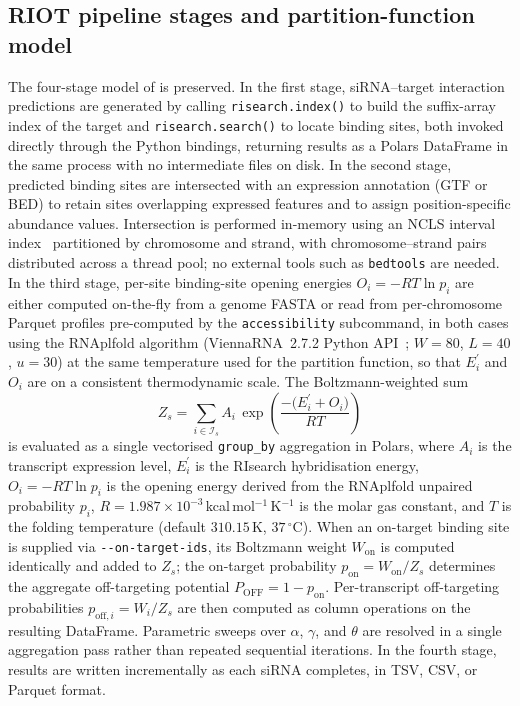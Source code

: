 \subsection*{RIOT pipeline stages and partition-function model}

The four-stage model of \citet{alkan2017risearch2} is preserved.
In the first stage, siRNA--target interaction predictions are generated by calling \texttt{risearch.index()} to build the suffix-array index of the target and \texttt{risearch.search()} to locate binding sites, both invoked directly through the Python bindings, returning results as a Polars DataFrame in the same process with no intermediate files on disk.
In the second stage, predicted binding sites are intersected with an expression annotation (GTF or BED) to retain sites overlapping expressed features and to assign position-specific abundance values.
Intersection is performed in-memory using an NCLS interval index~\citep{ncls} partitioned by chromosome and strand, with chromosome--strand pairs distributed across a thread pool; no external tools such as \texttt{bedtools} are needed.
In the third stage, per-site binding-site opening energies $O_i = -RT\ln p_i$ are either computed on-the-fly from a genome FASTA or read from per-chromosome Parquet profiles pre-computed by the \texttt{accessibility} subcommand, in both cases using the RNAplfold algorithm (ViennaRNA~2.7.2 Python API~\citep{lorenz2011vienna}; $W{=}80$, $L{=}40$, $u{=}30$) at the same temperature used for the partition function, so that $E^\prime_i$ and $O_i$ are on a consistent thermodynamic scale.
The Boltzmann-weighted sum
%
\begin{equation}
  Z_s = \sum_{i \in \mathcal{I}_s}
        A_i \,
        \exp\!\left(\frac{-\bigl(E^\prime_i + O_i\bigr)}{RT}\right)
  \label{eq:partition}
\end{equation}
%
\noindent is evaluated as a single vectorised \texttt{group\_by} aggregation in Polars, where $A_i$ is the transcript expression level, $E^\prime_i$ is the RIsearch hybridisation energy, $O_i = -RT\ln p_i$ is the opening energy derived from the RNAplfold unpaired probability $p_i$, $R = 1.987\times10^{-3}$\,kcal\,mol$^{-1}$\,K$^{-1}$ is the molar gas constant, and $T$ is the folding temperature (default $310.15$\,K, $37\,^\circ$C).
When an on-target binding site is supplied via \texttt{-{}-on-target-ids}, its Boltzmann weight $W_{\mathrm{on}}$ is computed identically and added to $Z_s$; the on-target probability $p_{\mathrm{on}} = W_{\mathrm{on}} / Z_s$ determines the aggregate off-targeting potential $P_{\mathrm{OFF}} = 1 - p_{\mathrm{on}}$.
Per-transcript off-targeting probabilities $p_{\mathrm{off},i} = W_i / Z_s$ are then computed as column operations on the resulting DataFrame.
Parametric sweeps over $\alpha$, $\gamma$, and $\theta$ are resolved in a single aggregation pass rather than repeated sequential iterations.
In the fourth stage, results are written incrementally as each siRNA completes, in TSV, CSV, or Parquet format.


